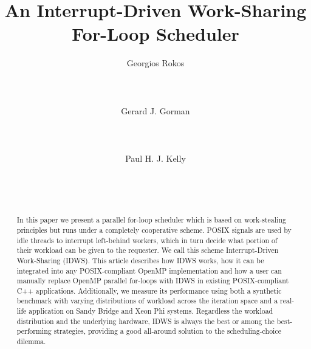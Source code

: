 \documentclass{acm_proc_article-sp}
\begin{document}
\title{An Interrupt-Driven Work-Sharing For-Loop Scheduler}

\author{
\alignauthor
Georgios Rokos\\
       \\
       \\
       \\
\alignauthor
Gerard J. Gorman\\
       \\
       \\
       \\
\alignauthor
Paul H. J. Kelly\\
       \\
       \\
       \\
}

\maketitle

\begin{abstract}


In this paper we present a parallel for-loop scheduler which is based on 
work-stealing principles but runs under a completely cooperative scheme. POSIX 
signals are used by idle threads to interrupt left-behind workers, which in 
turn decide what portion of their workload can be given to the requester. We 
call this scheme Interrupt-Driven Work-Sharing (IDWS). This article describes 
how IDWS works, how it can be integrated into any POSIX-compliant OpenMP 
implementation and how a user can manually replace OpenMP parallel for-loops 
with IDWS in existing POSIX-compliant C++ applications. Additionally, we
measure its performance using both a synthetic benchmark with varying
distributions of workload across the iteration space and a real-life
application on Sandy Bridge and Xeon Phi systems. Regardless the workload
distribution and the underlying hardware, IDWS is always the best or among the
best-performing strategies, providing a good all-around solution to the
scheduling-choice dilemma.
\end{abstract}
\end{document}
